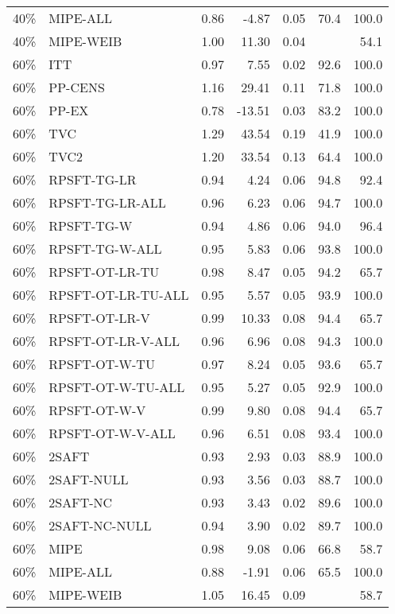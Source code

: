 \begin{table}[ht]
{\begin{tabular}{llrrrrr}
  40\% & MIPE-ALL & 0.86 & -4.87 & 0.05 & 70.4 & 100.0 \\ 
  40\% & MIPE-WEIB & 1.00 & 11.30 & 0.04 &  & 54.1 \\ 
   \hline
60\% & ITT & 0.97 & 7.55 & 0.02 & 92.6 & 100.0 \\ 
  60\% & PP-CENS & 1.16 & 29.41 & 0.11 & 71.8 & 100.0 \\ 
  60\% & PP-EX & 0.78 & -13.51 & 0.03 & 83.2 & 100.0 \\ 
  60\% & TVC & 1.29 & 43.54 & 0.19 & 41.9 & 100.0 \\ 
  60\% & TVC2 & 1.20 & 33.54 & 0.13 & 64.4 & 100.0 \\ 
   \hline
60\% & RPSFT-TG-LR & 0.94 & 4.24 & 0.06 & 94.8 & 92.4 \\ 
  60\% & RPSFT-TG-LR-ALL & 0.96 & 6.23 & 0.06 & 94.7 & 100.0 \\ 
  60\% & RPSFT-TG-W & 0.94 & 4.86 & 0.06 & 94.0 & 96.4 \\ 
  60\% & RPSFT-TG-W-ALL & 0.95 & 5.83 & 0.06 & 93.8 & 100.0 \\ 
  60\% & RPSFT-OT-LR-TU & 0.98 & 8.47 & 0.05 & 94.2 & 65.7 \\ 
  60\% & RPSFT-OT-LR-TU-ALL & 0.95 & 5.57 & 0.05 & 93.9 & 100.0 \\ 
  60\% & RPSFT-OT-LR-V & 0.99 & 10.33 & 0.08 & 94.4 & 65.7 \\ 
  60\% & RPSFT-OT-LR-V-ALL & 0.96 & 6.96 & 0.08 & 94.3 & 100.0 \\ 
   \hline
60\% & RPSFT-OT-W-TU & 0.97 & 8.24 & 0.05 & 93.6 & 65.7 \\ 
  60\% & RPSFT-OT-W-TU-ALL & 0.95 & 5.27 & 0.05 & 92.9 & 100.0 \\ 
  60\% & RPSFT-OT-W-V & 0.99 & 9.80 & 0.08 & 94.4 & 65.7 \\ 
  60\% & RPSFT-OT-W-V-ALL & 0.96 & 6.51 & 0.08 & 93.4 & 100.0 \\ 
   \hline
60\% & 2SAFT & 0.93 & 2.93 & 0.03 & 88.9 & 100.0 \\ 
  60\% & 2SAFT-NULL & 0.93 & 3.56 & 0.03 & 88.7 & 100.0 \\ 
  60\% & 2SAFT-NC & 0.93 & 3.43 & 0.02 & 89.6 & 100.0 \\ 
  60\% & 2SAFT-NC-NULL & 0.94 & 3.90 & 0.02 & 89.7 & 100.0 \\ 
  60\% & MIPE & 0.98 & 9.08 & 0.06 & 66.8 & 58.7 \\ 
  60\% & MIPE-ALL & 0.88 & -1.91 & 0.06 & 65.5 & 100.0 \\ 
  60\% & MIPE-WEIB & 1.05 & 16.45 & 0.09 &  & 58.7 \\ 
   \hline
\end{tabular}
}
\end{table}
